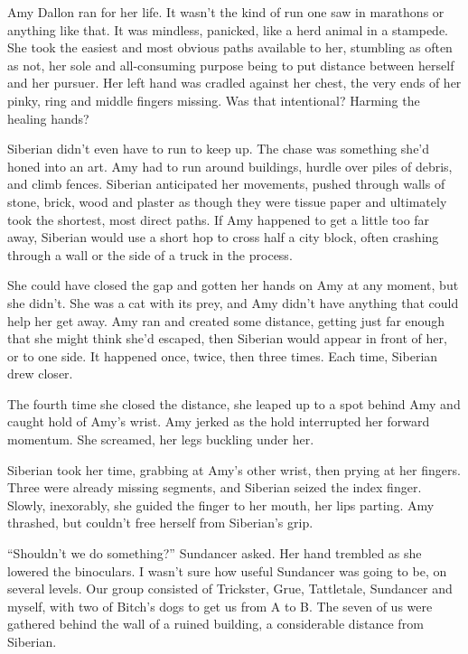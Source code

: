 





Amy Dallon ran for her life.  It wasn't the kind of run one saw in marathons or anything like that.  It was mindless, panicked, like a herd animal in a stampede.  She took the easiest and most obvious paths available to her, stumbling as often as not, her sole and all-consuming purpose being to put distance between herself and her pursuer.  Her left hand was cradled against her chest, the very ends of her pinky, ring and middle fingers missing.  Was that intentional?  Harming the healing hands?



Siberian didn't even have to run to keep up.  The chase was something she'd honed into an art.  Amy had to run around buildings, hurdle over piles of debris, and climb fences.  Siberian anticipated her movements, pushed through walls of stone, brick, wood and plaster as though they were tissue paper and ultimately took the shortest, most direct paths.  If Amy happened to get a little too far away, Siberian would use a short hop to cross half a city block, often crashing through a wall or the side of a truck in the process.



She could have closed the gap and gotten her hands on Amy at any moment, but she didn't.  She was a cat with its prey, and Amy didn't have anything that could help her get away.  Amy ran and created some distance, getting just far enough that she might think she'd escaped, then Siberian would appear in front of her, or to one side.  It happened once, twice, then three times.  Each time, Siberian drew closer.



The fourth time she closed the distance, she leaped up to a spot behind Amy and caught hold of Amy's wrist.  Amy jerked as the hold interrupted her forward momentum.  She screamed, her legs buckling under her.



Siberian took her time, grabbing at Amy's other wrist, then prying at her fingers.  Three were already missing segments, and Siberian seized the index finger.  Slowly, inexorably, she guided the finger to her mouth, her lips parting.  Amy thrashed, but couldn't free herself from Siberian's grip.



``Shouldn't we do something?''  Sundancer asked.  Her hand trembled as she lowered the binoculars.  I wasn't sure how useful Sundancer was going to be, on several levels.  Our group consisted of Trickster, Grue, Tattletale, Sundancer and myself, with two of Bitch's dogs to get us from A to B.  The seven of us were gathered behind the wall of a ruined building, a considerable distance from Siberian.




